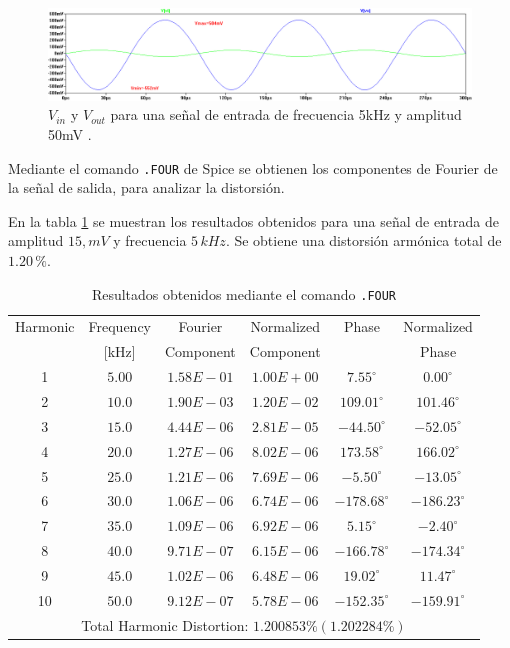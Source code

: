 \documentclass[10pt,spanish,a4paper,notitlepage]{article}
\begin{document}
\begin{figure}[H]
\centering
\includegraphics[scale=0.45]{senales/simulacion-max-exc-con-distorsion.png}
\caption{$V_{in}$ y $V_{out}$  para una señal de entrada de frecuencia  5\unit{kHz}  y  amplitud  50\unit{mV} .}
\label{fig:SIMUmax_con_distorsion}
\end{figure}

Mediante el comando \texttt{.FOUR} de Spice se obtienen
los componentes de Fourier de la señal de salida, para
analizar la distorsión. 

En la tabla \ref{table:tabla_four} se muestran los resultados obtenidos para una 
señal de entrada de amplitud $15,\unit{mV}$ y frecuencia $5\,\unit{kHz}$. 
Se obtiene una distorsión armónica total de $1.20\,\unit{\%}$.

\begin{table}[H]
\centering
\begin{tabular}{|c|c|c|c|c|c|} 
\hline
Harmonic & Frequency & Fourier & Normalized	& Phase	& Normalized \\
  & [kHz] & Component & Component	&  	& Phase \\ \hline

1	&	$	5.00	$	&	$	1.58E-01	$	&	$	1.00E+00	$	&	$	    7.55	^\circ	$	&	$	    0.00	^\circ	$	\\ \hline
2	&	$	10.0	$	&	$	1.90E-03	$	&	$	1.20E-02	$	&	$	  109.01	^\circ	$	&	$	  101.46	^\circ	$	\\ \hline
3	&	$	15.0	$	&	$	4.44E-06	$	&	$	2.81E-05	$	&	$	  -44.50	^\circ	$	&	$	  -52.05	^\circ	$	\\ \hline
4	&	$	20.0	$	&	$	1.27E-06	$	&	$	8.02E-06	$	&	$	  173.58	^\circ	$	&	$	  166.02	^\circ	$	\\ \hline
5	&	$	25.0	$	&	$	1.21E-06	$	&	$	7.69E-06	$	&	$	   -5.50	^\circ	$	&	$	  -13.05	^\circ	$	\\ \hline
6	&	$	30.0	$	&	$	1.06E-06	$	&	$	6.74E-06	$	&	$	 -178.68	^\circ	$	&	$	 -186.23	^\circ	$	\\ \hline
7	&	$	35.0	$	&	$	1.09E-06	$	&	$	6.92E-06	$	&	$	    5.15	^\circ	$	&	$	   -2.40	^\circ	$	\\ \hline
8	&	$	40.0	$	&	$	9.71E-07	$	&	$	6.15E-06	$	&	$	 -166.78	^\circ	$	&	$	 -174.34	^\circ	$	\\ \hline
9	&	$	45.0	$	&	$	1.02E-06	$	&	$	6.48E-06	$	&	$	   19.02	^\circ	$	&	$	   11.47	^\circ	$	\\ \hline
10	&	$	50.0	$	&	$	9.12E-07	$	&	$	5.78E-06	$	&	$	 -152.35	^\circ	$	&	$	 -159.91	^\circ	$	\\ \hline
\multicolumn{6}{|c|}{Total Harmonic Distortion: $1.200853\%(1.202284\%)$}\\ \hline
\end{tabular}
\caption{Resultados obtenidos mediante el comando \texttt{.FOUR}}
\label{table:tabla_four}
\end{table}
\end{document}
